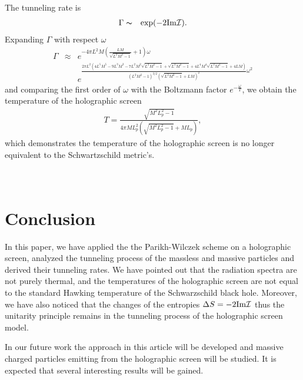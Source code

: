 \documentclass[12pt]{article}
\begin{document}
The tunneling rate is
\begin{eqnarray}
\Gamma  &\thicksim& \exp(-2 {\rm Im}{\cal I}).
 \end{eqnarray}
Expanding $\Gamma$ with respect $\omega$
\begin{eqnarray}
\Gamma  &\approx&   e^{-4 \pi  L^2 M   \left(\frac{L M}{\sqrt{L^2 M^2-1}}+1\right) \omega}    \nonumber\\
&&e^{\frac{2 \pi  L^2 \left(4 L^5 M^5-9 L^3 M^3-7 L^2 M^2 \sqrt{L^2 M^2-1}+\sqrt{L^2 M^2-1}+4 L^4 M^4 \sqrt{L^2 M^2-1}+4 L M\right)}{\left(L^2 M^2-1\right)^{3/2} \left(\sqrt{L^2 M^2-1}+L M\right)^2}\omega ^2 }
\end{eqnarray}
and comparing the first order of $\omega$ with the Boltzmann factor $e^{-\frac{\omega }{T}}$, we obtain the temperature of the holographic screen
\begin{eqnarray}
T=\frac{\sqrt{M^2 L_p^2 - 1}}{4 \pi M L_p^2 \left(\sqrt{ M^2 L_p^2 - 1}+M  L_p \right)},
\end{eqnarray}
which  demonstrates the temperature of the holographic screen is no longer equivalent to the Schwartzschild metric's.
\\
\\
\\
\section{Conclusion}
In this paper, we have applied the the Parikh-Wilczek scheme on a holographic screen, analyzed the tunneling process of the massless and massive particles and derived their tunneling rates. We have pointed out that the radiation spectra are not purely thermal,
and the temperatures of the holographic screen are not equal to the standard Hawking temperature of the Schwarzschild black hole. Moreover, we have also noticed that the changes of the entropies $\Delta S = -2{\rm Im}{\cal I}$  thus the unitarity principle
remains in the tunneling process of the holographic screen model.

In our future work the approach in this article will be developed and massive charged particles emitting from
the holographic screen will be studied. It is expected that several interesting results will be gained.
\end{document}
